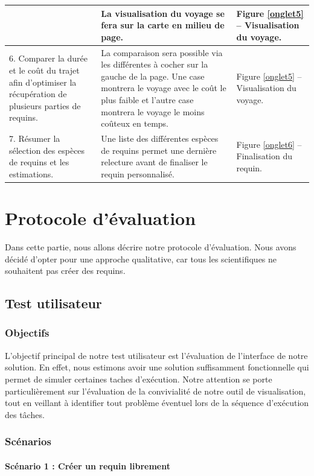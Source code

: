 \documentclass{article}
\begin{document}
\begin{center}
\begin{tabular}{|p{3.5cm}|p{7cm}|p{3.5cm}|}
		 &
		La visualisation du voyage se fera sur la carte en milieu de page.
		 &
		Figure \ref{onglet5} – Visualisation du voyage.
		\\\hline
		6. Comparer la durée et le coût du trajet afin d’optimiser la récupération de plusieurs parties de requins.
		 &
		La comparaison sera possible via les différentes à cocher sur la gauche de la page. Une case montrera le voyage avec le coût le plus faible et l’autre case montrera le voyage le moins coûteux en temps.
		 &
		Figure \ref{onglet5} – Visualisation du voyage.
		\\\hline
		7. Résumer la sélection des espèces de requins et les estimations.
		 &
		Une liste des différentes espèces de requins permet une dernière relecture avant de finaliser le requin personnalisé.
		 &
		Figure \ref{onglet6} – Finalisation du requin.
		\\\hline
	\end{tabular}
\end{center}

\section{Protocole d'évaluation}
Dans cette partie, nous allons décrire notre protocole d’évaluation. Nous avons décidé d'opter pour une approche qualitative, car tous les scientifiques ne souhaitent pas créer des requins.

\subsection{Test utilisateur}

\subsubsection{Objectifs}
L'objectif principal de notre test utilisateur est l'évaluation de l'interface de notre solution. En effet, nous estimons avoir une solution suffisamment fonctionnelle qui permet de simuler certaines taches d'exécution.
Notre attention se porte particulièrement sur l'évaluation de la convivialité de notre outil de visualisation, tout en veillant à identifier tout problème éventuel lors de la séquence d'exécution des tâches.

\subsubsection{Scénarios}

\paragraph{Scénario 1 : Créer un requin librement}
\end{document}

